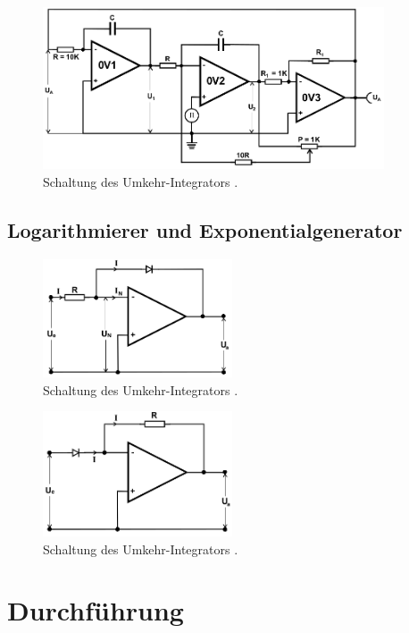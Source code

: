\begin{figure}[t]
 \includegraphics[width = 0.9\textwidth]{../pics/sinus.png}
 \caption{Schaltung des Umkehr-Integrators \cite{Anl}.}
 \label{pic:sinus}
\end{figure}

\subsection{Logarithmierer und Exponentialgenerator}
\begin{figure}[t]
 \includegraphics[width = 0.5\textwidth]{../pics/log.png}
 \caption{Schaltung des Umkehr-Integrators \cite{Anl}.}
 \label{pic:log}
\end{figure}

\begin{figure}[t]
 \includegraphics[width = 0.5\textwidth]{../pics/exp.png}
 \caption{Schaltung des Umkehr-Integrators \cite{Anl}.}
 \label{pic:exp}
\end{figure}


\section{Durchführung}

